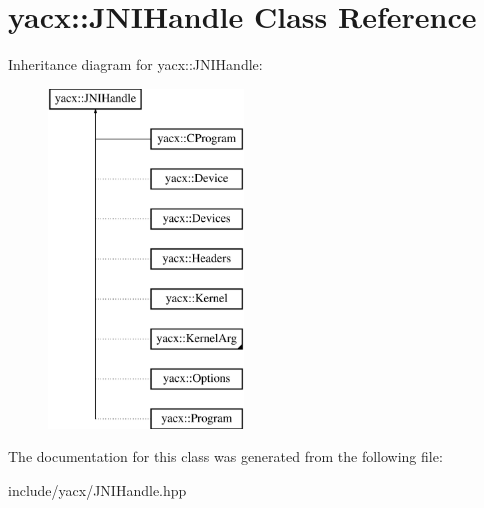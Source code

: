 \hypertarget{classyacx_1_1_j_n_i_handle}{}\section{yacx\+:\+:J\+N\+I\+Handle Class Reference}
\label{classyacx_1_1_j_n_i_handle}
Inheritance diagram for yacx\+:\+:J\+N\+I\+Handle\+:\begin{figure}[H]
\begin{center}
\leavevmode
\includegraphics[height=9.000000cm]{classyacx_1_1_j_n_i_handle}
\end{center}
\end{figure}


The documentation for this class was generated from the following file\+:\begin{DoxyCompactItemize}
\item 
include/yacx/J\+N\+I\+Handle.\+hpp\end{DoxyCompactItemize}
